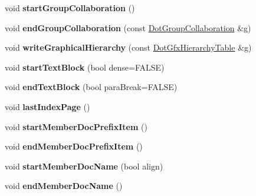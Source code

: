 \begin{DoxyCompactItemize}
\item 
\hypertarget{class_output_list_ac75e421f535cd69ad8b286bb5682f98a}{void {\bfseries start\-Group\-Collaboration} ()}\label{class_output_list_ac75e421f535cd69ad8b286bb5682f98a}

\item 
\hypertarget{class_output_list_abf4d1f5c7a6de661874865317e848973}{void {\bfseries end\-Group\-Collaboration} (const \hyperlink{class_dot_group_collaboration}{Dot\-Group\-Collaboration} \&g)}\label{class_output_list_abf4d1f5c7a6de661874865317e848973}

\item 
\hypertarget{class_output_list_ade237967fa53c8c01a1477ebe3fe79e9}{void {\bfseries write\-Graphical\-Hierarchy} (const \hyperlink{class_dot_gfx_hierarchy_table}{Dot\-Gfx\-Hierarchy\-Table} \&g)}\label{class_output_list_ade237967fa53c8c01a1477ebe3fe79e9}

\item 
\hypertarget{class_output_list_a6861203fdfa560494f56b850c00dc20c}{void {\bfseries start\-Text\-Block} (bool dense=F\-A\-L\-S\-E)}\label{class_output_list_a6861203fdfa560494f56b850c00dc20c}

\item 
\hypertarget{class_output_list_aec142c7c44bd4460dd45032869c22d8e}{void {\bfseries end\-Text\-Block} (bool para\-Break=F\-A\-L\-S\-E)}\label{class_output_list_aec142c7c44bd4460dd45032869c22d8e}

\item 
\hypertarget{class_output_list_a9fcbfbb9afd01da287ac464c1da0d778}{void {\bfseries last\-Index\-Page} ()}\label{class_output_list_a9fcbfbb9afd01da287ac464c1da0d778}

\item 
\hypertarget{class_output_list_a69e0980a62e287e8543cc10ac407483b}{void {\bfseries start\-Member\-Doc\-Prefix\-Item} ()}\label{class_output_list_a69e0980a62e287e8543cc10ac407483b}

\item 
\hypertarget{class_output_list_a797315065ef118ee81fc1828eb5f7e5d}{void {\bfseries end\-Member\-Doc\-Prefix\-Item} ()}\label{class_output_list_a797315065ef118ee81fc1828eb5f7e5d}

\item 
\hypertarget{class_output_list_a2abf88a5aa423056ec6e9bcef68f6094}{void {\bfseries start\-Member\-Doc\-Name} (bool align)}\label{class_output_list_a2abf88a5aa423056ec6e9bcef68f6094}

\item 
\hypertarget{class_output_list_ab8f5f35025a2dfa4026e02e5e586b27e}{void {\bfseries end\-Member\-Doc\-Name} ()}\label{class_output_list_ab8f5f35025a2dfa4026e02e5e586b27e}


\end{DoxyCompactItemize}
